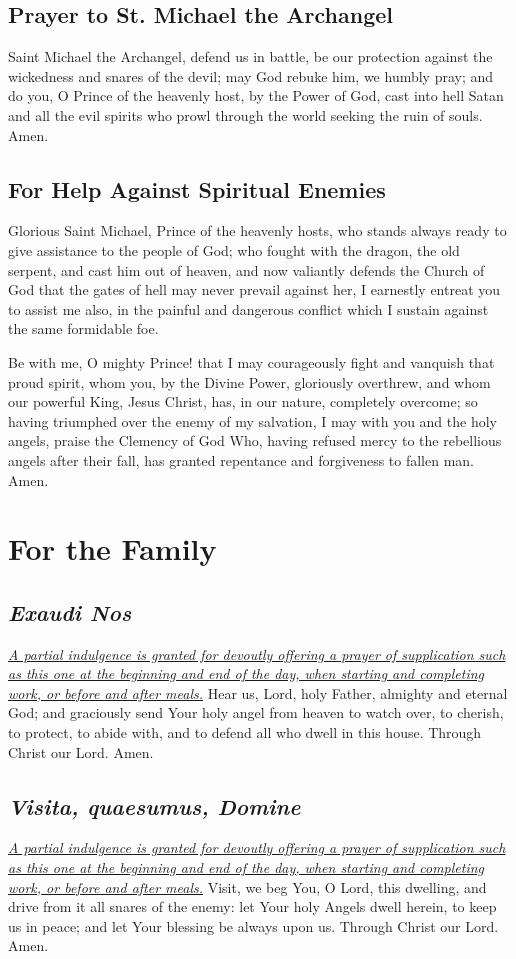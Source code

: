 \documentclass[12pt]{article}
\newcommand{\prayersection}[1]{\section{#1}}
\newcommand{\prayertitle}[1]{\subsection{#1}}
\newcommand{\indulgencedprayertitle}[1]{\prayertitle{#1 \protect\kreuz}}
\newcommand{\emphasis}[1]{\emph{#1}}
\newcommand{\emphasis}[1]{\textsl{#1}}
\newcommand{\foreign}[1]{\emphasis{#1}}
\newcommand{\note}[1]{{\small{\emphasis{#1}}}\newline}
\newcommand{\linkednote}[2]{\hyperlink{#1}{\note{#2}}}
\begin{document}
\prayertitle{Prayer to St. Michael the Archangel}
\label{prayer:StMichael}
Saint Michael the Archangel, defend us in battle, be our protection against the wickedness and snares of the devil;
may God rebuke him, we humbly pray;
and do you, O Prince of the heavenly host, by the Power of God, cast into hell Satan and all the evil spirits who prowl through the world seeking the ruin of souls.
Amen.

\prayertitle{For Help Against Spiritual Enemies}
\label{prayer:help_against_spiritual_enemies}
Glorious Saint Michael, Prince of the heavenly hosts, who stands always ready to give assistance to the people of God;
who fought with the dragon, the old serpent, and cast him out of heaven, and now valiantly defends the Church of God that the gates of hell may never prevail against her, I earnestly entreat you to assist me also, in the painful and dangerous conflict which I sustain against the same formidable foe.

Be with me, O mighty Prince!
that I may courageously fight and vanquish that proud spirit, whom you, by the Divine Power, gloriously overthrew, and whom our powerful King, Jesus Christ, has, in our nature, completely overcome;
so having triumphed over the enemy of my salvation, I may with you and the holy angels, praise the Clemency of God Who, having refused mercy to the rebellious angels after their fall, has granted repentance and forgiveness to fallen man. Amen.

\newpage

\prayersection{For the Family}
\indulgencedprayertitle{\foreign{Exaudi Nos}}
\linkednote{grant26}{A partial indulgence is granted for devoutly offering a prayer of supplication such as this one at the beginning and end of the day, when starting and completing work, or before and after meals.}
Hear us, Lord, holy Father, almighty and eternal God;
and graciously send Your holy angel from heaven to watch over, to cherish, to protect, to abide with, and to defend all who dwell in this house.
Through Christ our Lord. Amen.

\indulgencedprayertitle{\foreign{Visita, quaesumus, Domine}}
\linkednote{grant26}{A partial indulgence is granted for devoutly offering a prayer of supplication such as this one at the beginning and end of the day, when starting and completing work, or before and after meals.}
Visit, we beg You, O Lord, this dwelling, and drive from it all snares of the enemy:
let Your holy Angels dwell herein, to keep us in peace;
and let Your blessing be always upon us.
Through Christ our Lord.
Amen.
\end{document}
